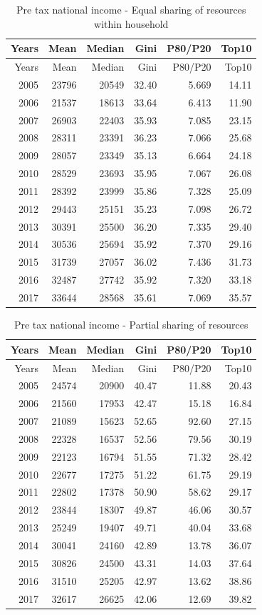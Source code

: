 \documentclass[12pt,]{article}
\begin{document}
\begin{longtable}[]{@{}rrrrrr@{}}
\caption{Pre tax national income - Equal sharing of resources within
household}\tabularnewline
\toprule
Years & Mean & Median & Gini & P80/P20 & Top10\tabularnewline
\midrule
\endfirsthead
\toprule
Years & Mean & Median & Gini & P80/P20 & Top10\tabularnewline
\midrule
\endhead
2005 & 23796 & 20549 & 32.40 & 5.669 & 14.11\tabularnewline
2006 & 21537 & 18613 & 33.64 & 6.413 & 11.90\tabularnewline
2007 & 26903 & 22403 & 35.93 & 7.085 & 23.15\tabularnewline
2008 & 28311 & 23391 & 36.23 & 7.066 & 25.68\tabularnewline
2009 & 28057 & 23349 & 35.13 & 6.664 & 24.18\tabularnewline
2010 & 28529 & 23693 & 35.95 & 7.067 & 26.08\tabularnewline
2011 & 28392 & 23999 & 35.86 & 7.328 & 25.09\tabularnewline
2012 & 29443 & 25151 & 35.23 & 7.098 & 26.72\tabularnewline
2013 & 30391 & 25500 & 36.20 & 7.335 & 29.40\tabularnewline
2014 & 30536 & 25694 & 35.92 & 7.370 & 29.16\tabularnewline
2015 & 31739 & 27057 & 36.02 & 7.436 & 31.73\tabularnewline
2016 & 32487 & 27742 & 35.92 & 7.320 & 33.18\tabularnewline
2017 & 33644 & 28568 & 35.61 & 7.069 & 35.57\tabularnewline
\bottomrule
\end{longtable}

\begin{longtable}[]{@{}rrrrrr@{}}
\caption{Pre tax national income - Partial sharing of
resources}\tabularnewline
\toprule
Years & Mean & Median & Gini & P80/P20 & Top10\tabularnewline
\midrule
\endfirsthead
\toprule
Years & Mean & Median & Gini & P80/P20 & Top10\tabularnewline
\midrule
\endhead
2005 & 24574 & 20900 & 40.47 & 11.88 & 20.43\tabularnewline
2006 & 21560 & 17953 & 42.47 & 15.18 & 16.84\tabularnewline
2007 & 21089 & 15623 & 52.65 & 92.60 & 27.15\tabularnewline
2008 & 22328 & 16537 & 52.56 & 79.56 & 30.19\tabularnewline
2009 & 22123 & 16794 & 51.55 & 71.32 & 28.42\tabularnewline
2010 & 22677 & 17275 & 51.22 & 61.75 & 29.19\tabularnewline
2011 & 22802 & 17378 & 50.90 & 58.62 & 29.17\tabularnewline
2012 & 23844 & 18307 & 49.87 & 46.06 & 30.57\tabularnewline
2013 & 25249 & 19407 & 49.71 & 40.04 & 33.68\tabularnewline
2014 & 30041 & 24160 & 42.89 & 13.78 & 36.07\tabularnewline
2015 & 30826 & 24500 & 43.31 & 14.03 & 37.64\tabularnewline
2016 & 31510 & 25205 & 42.97 & 13.62 & 38.86\tabularnewline
2017 & 32617 & 26625 & 42.06 & 12.69 & 39.82\tabularnewline
\bottomrule
\end{longtable}
\end{document}
